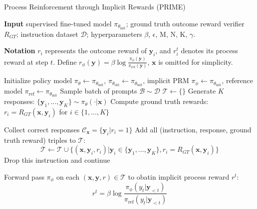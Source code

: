 \begin{algorithm*}


\caption{Process Reinforcement through Implicit Rewards (PRIME)}
\textbf{Input} supervised fine-tuned model $\pi_{\theta_{\text{init}}}$; ground truth outcome reward verifier $R_{GT}$; instruction dataset $\mathcal{D}$; hyperparameters $\beta$, $\epsilon$, M, N, K, $\gamma$.

\textbf{Notation} $r_i$ represents the outcome reward of $\mathbf{y}_i$, and $r_i^t$ denotes its process reward at step $t$.
Define $r_\phi \left(\mathbf{y}\right) = \beta \log \frac{\pi_\phi(\mathbf{y})}{\pi_{\text{ref}}(\mathbf{y})}$, $\mathbf{x}$ is omitted for simplicity.
\begin{algorithmic}[1]
\State Initialize policy model $\pi_\theta \leftarrow \pi_{\theta_{\text{init}}}$, $\pi_{\theta_{\text{old}}} \leftarrow \pi_{\theta_{\text{init}}}$, implicit PRM $\pi_{\phi} \leftarrow \pi_{\theta_{\text{init}}}$, reference model $\pi_{\text{ref}} \leftarrow \pi_{\theta_{\text{init}}}$
    \State Sample batch of prompts $\mathcal{B} \sim \mathcal{D}$
    \State $\mathcal{T} \leftarrow \{\}$
        \State Generate $K$ responses: $\{\mathbf{y}_1, ..., \mathbf{y}_K\} \sim \pi_\theta(\cdot|\mathbf{x})$
        \State Compute ground truth rewards: $r_i = R_{GT}\left(\mathbf{x}, \mathbf{y}_i\right)$ for $i \in \{1,...,K\}$

        \State Collect correct responses $\mathcal{C}_\mathbf{x} = \{\mathbf{y}_i | r_i = 1\}$
            \State Add all (instruction, response, ground truth reward) triples to $\mathcal{T}$:
            \[\mathcal{T} \leftarrow \mathcal{T} \cup \{(\mathbf{x}, \mathbf{y}_i, r_i) | \mathbf{y}_i \in \{\mathbf{y}_1, ..., \mathbf{y}_K\}, r_i = R_{GT}(\mathbf{x}, \mathbf{y}_i)\}\]
        \Else
            \State Drop this instruction and continue
        \EndIf
    \EndFor



        \State Forward pass $\pi_\phi$ on each $(\mathbf{x}, \mathbf{y}, r) \in \mathcal{T}$ to obatin implicit process reward $r^t$:
            \[r^t = \beta \log \frac{\pi_\phi(y_{t}|\mathbf{y}_{<t})}{\pi_{\text{ref}}(y_{t}|\mathbf{y}_{<t})}\]
            

\end{algorithmic}
\end{algorithm*}
